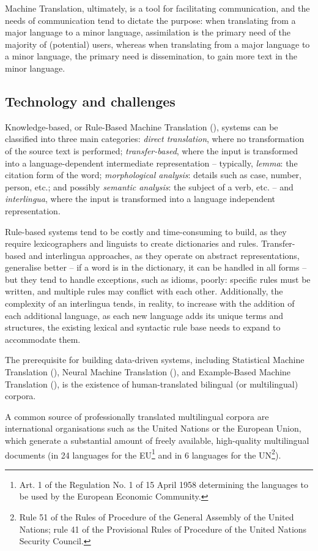 Machine Translation, ultimately, is a tool for facilitating communication, and the needs of communication 
tend to dictate the purpose: when translating from a major language to a minor language, assimilation 
is the primary need of the majority of (potential) users, whereas when translating from a major language 
to a minor language, the primary need is dissemination, to gain more text in the minor language.

\subsection{Technology and challenges}

Knowledge-based, or Rule-Based Machine Translation (), systems can be classified into three main categories: \textit{direct translation}, where no 
transformation of the source text is performed; \textit{transfer-based}, where the input is transformed 
into a language-dependent intermediate representation -- typically, \textit{lemma}: the citation 
form of the word; \textit{morphological analysis}: details such as case, number, person, etc.; and 
possibly \textit{semantic analysis}: the subject of a verb, etc. -- and \textit{interlingua}, where the 
input is transformed into a language independent representation. 

Rule-based systems tend to be costly and time-consuming to build, as they require lexicographers and 
linguists to create dictionaries and rules. Transfer-based and interlingua approaches, as they operate 
on abstract representations, generalise better -- if a word is in the dictionary, it can be handled in 
all forms -- but they tend to handle exceptions, such as idioms, poorly: specific rules must be written, 
and multiple rules may conflict with each other. Additionally, the complexity of an interlingua tends,
in reality, to increase with the addition of each additional language, as each new language adds its
unique terms and structures, the existing lexical and syntactic rule base needs to expand to 
accommodate them.

The prerequisite for building data-driven systems, including Statistical Machine Translation (),
Neural Machine Translation (), and Example-Based Machine Translation (), is the 
existence of human-translated bilingual (or multilingual) corpora.

A common source of professionally translated multilingual corpora are international organisations such 
as the United Nations or the European Union, which generate a substantial amount of freely available, 
high-quality multilingual documents (in 24 languages for the EU\footnote{Art. 1 of the Regulation No. 1 
of 15 April 1958 determining the languages to be used by the European Economic Community.} and in 6 
languages for the UN\footnote{Rule 51 of the Rules of Procedure of the General Assembly of the United 
Nations; rule 41 of the Provisional Rules of Procedure of the United Nations Security Council.}).

